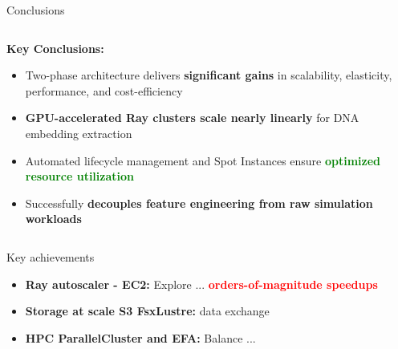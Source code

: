 \documentclass[aspectratio=169]{beamer}
\begin{document}
\begin{frame}{Conclusions}
    \begin{columns}
        \begin{column}{0.6\textwidth}
            \textbf{Key Conclusions:}
            \begin{itemize}
                \item Two-phase architecture delivers \textbf{significant gains} in scalability, elasticity, performance, and cost-efficiency
                \item \textcolor{rayblue}{\textbf{GPU-accelerated Ray clusters scale nearly linearly}} for DNA embedding extraction
                \item Automated lifecycle management and Spot Instances ensure \textcolor{green}{\textbf{optimized resource utilization}}
                \item Successfully \textbf{decouples feature engineering from raw simulation workloads}
            \end{itemize}
        \end{column}
        \begin{column}{0.4\textwidth}
        \end{column}
    \end{columns}
    
    \vspace{0.3cm}
    \begin{block}{Key achievements}
        \begin{itemize}
            \item \textbf{Ray autoscaler - EC2:} Explore ... \textcolor{red}{\textbf{orders-of-magnitude speedups}}
            \item \textbf{Storage at scale S3 FsxLustre:} data exchange
            \item \textbf{HPC ParallelCluster and EFA:} Balance ...
        \end{itemize}
    \end{block}
\end{frame}
\end{document}
